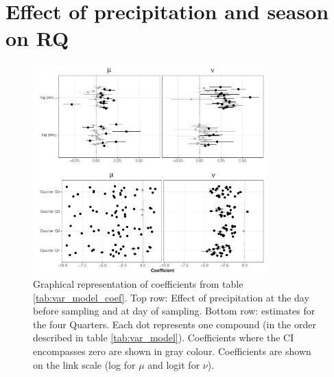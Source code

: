 \documentclass[pdftex,
	a4paper,
	titlepage=false]{scrreprt}
\begin{document}
\chapter{Effect of precipitation and season on RQ}


\newpage


\begin{figure}[ht]
	\centering
	\includegraphics[width = 0.8\textwidth]{coefs}
	\caption[Graphical representation of coefficients from table \ref{tab:var_model_coef}.]{Graphical representation of coefficients from table \ref{tab:var_model_coef}. Top row: Effect of precipitation at the day before sampling and at day of sampling. Bottom row: estimates for the four Quarters. Each dot represents one compound (in the order described in table \ref{tab:var_model}). Coefficients where the CI encompasses zero are shown in gray colour. Coefficients are shown on the link scale (log for $\mu$ and logit for $\nu$).}
	\label{fig:coefs}
\end{figure}
\end{document}
